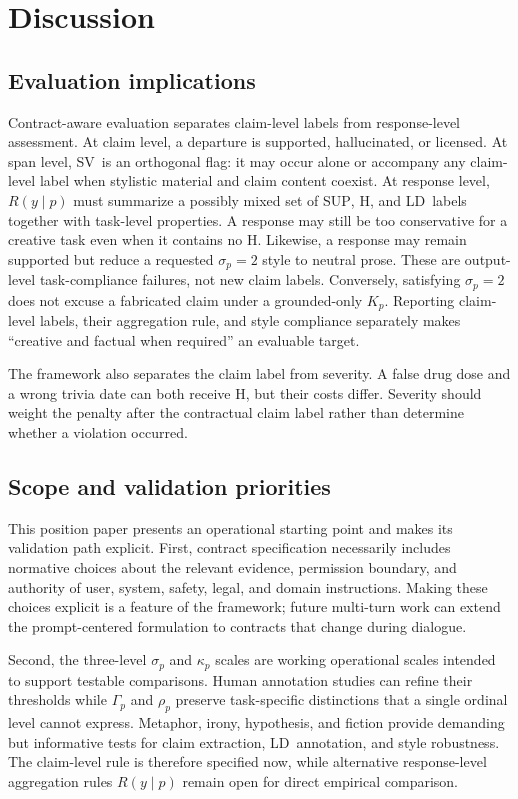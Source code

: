 \documentclass{clv2025}
\newcommand{\LD}{\textsc{LD}}
\newcommand{\Hall}{\textsc{H}}
\newcommand{\SUP}{\textsc{SUP}}
\newcommand{\SV}{\textsc{SV}}
\begin{document}
\section{Discussion}\label{sec:discussion}

\subsection{Evaluation implications}

Contract-aware evaluation separates claim-level labels from response-level assessment.
At claim level, a departure is supported, hallucinated, or licensed.
At span level, \SV\ is an orthogonal flag: it may occur alone or accompany any claim-level label when stylistic material and claim content coexist.
At response level, $R(y\mid p)$ must summarize a possibly mixed set of \SUP, \Hall, and \LD\ labels together with task-level properties.
A response may still be too conservative for a creative task even when it contains no \Hall.
Likewise, a response may remain supported but reduce a requested $\sigma_p=2$ style to neutral prose.
These are output-level task-compliance failures, not new claim labels.
Conversely, satisfying $\sigma_p=2$ does not excuse a fabricated claim under a grounded-only $K_p$.
Reporting claim-level labels, their aggregation rule, and style compliance separately makes ``creative and factual when required'' an evaluable target.

The framework also separates the claim label from severity.
A false drug dose and a wrong trivia date can both receive \Hall, but their costs differ.
Severity should weight the penalty after the contractual claim label rather than determine whether a violation occurred.

\subsection{Scope and validation priorities}

This position paper presents an operational starting point and makes its validation path explicit.
First, contract specification necessarily includes normative choices about the relevant evidence, permission boundary, and authority of user, system, safety, legal, and domain instructions.
Making these choices explicit is a feature of the framework; future multi-turn work can extend the prompt-centered formulation to contracts that change during dialogue.

Second, the three-level $\sigma_p$ and $\kappa_p$ scales are working operational scales intended to support testable comparisons.
Human annotation studies can refine their thresholds while $\Gamma_p$ and $\rho_p$ preserve task-specific distinctions that a single ordinal level cannot express.
Metaphor, irony, hypothesis, and fiction provide demanding but informative tests for claim extraction, \LD\ annotation, and style robustness.
The claim-level rule is therefore specified now, while alternative response-level aggregation rules $R(y\mid p)$ remain open for direct empirical comparison.
\end{document}
